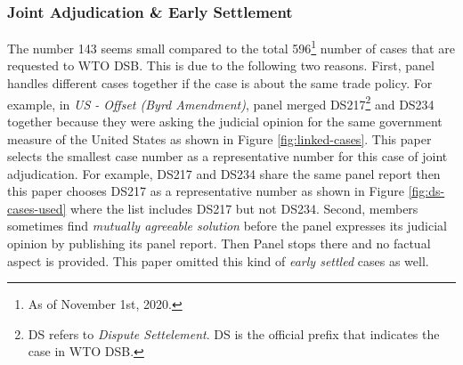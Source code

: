 \subsubsection{Joint Adjudication \& Early Settlement}
The number 143 seems small compared to the total 596\footnote
{As of November 1st, 2020.} number of cases that are requested to WTO DSB. This is due to the following two reasons.
First, panel handles different cases together if the case is about the
same trade policy. For example, in \textit{US - Offset (Byrd Amendment)}, panel merged DS217\footnote{
  DS refers to \textit{Dispute Settelement}. DS is the official prefix that indicates the case in WTO DSB.
} and DS234 together because they were asking the judicial opinion for the same government measure of the United States as shown in Figure \ref{fig:linked-cases}.
This paper selects the smallest case number as a representative number for this case of joint adjudication.
For example, DS217 and DS234 share the same panel report then this paper chooses DS217 as a representative number as shown in Figure \ref{fig:ds-cases-used} where the list includes DS217 but not DS234.
Second, members sometimes find \textit{mutually agreeable solution} before the panel expresses its judicial opinion by publishing its panel report. Then Panel stops there and no factual aspect is provided. This paper omitted this kind of \textit{early settled} cases as well.
